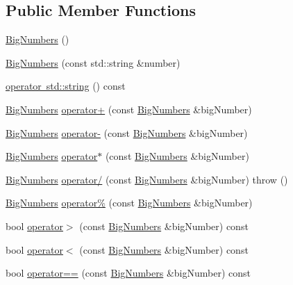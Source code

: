 \subsection*{Public Member Functions}
\begin{DoxyCompactItemize}
\item 
\mbox{\hyperlink{class_big_numbers_af3dd82883f10f3473ac83280f26b0ad8}{Big\+Numbers}} ()
\item 
\mbox{\hyperlink{class_big_numbers_a7aca99911efb6981ac70f1514e8f2a5e}{Big\+Numbers}} (const std\+::string \&number)
\item 
\mbox{\hyperlink{class_big_numbers_af879df797b67fcbe442746d0532529ab}{operator std\+::string}} () const
\item 
\mbox{\hyperlink{class_big_numbers}{Big\+Numbers}} \mbox{\hyperlink{class_big_numbers_a680111de22672f72e0e102b42352d3bc}{operator+}} (const \mbox{\hyperlink{class_big_numbers}{Big\+Numbers}} \&big\+Number)
\item 
\mbox{\hyperlink{class_big_numbers}{Big\+Numbers}} \mbox{\hyperlink{class_big_numbers_ad4b60c48e9da0bd5f9845d7ce73bdc90}{operator-\/}} (const \mbox{\hyperlink{class_big_numbers}{Big\+Numbers}} \&big\+Number)
\item 
\mbox{\hyperlink{class_big_numbers}{Big\+Numbers}} \mbox{\hyperlink{class_big_numbers_a831e8203da581ad999f9f45940a92776}{operator$\ast$}} (const \mbox{\hyperlink{class_big_numbers}{Big\+Numbers}} \&big\+Number)
\item 
\mbox{\hyperlink{class_big_numbers}{Big\+Numbers}} \mbox{\hyperlink{class_big_numbers_af7ad124c6e92a0ae647f3aa3cd85f11a}{operator/}} (const \mbox{\hyperlink{class_big_numbers}{Big\+Numbers}} \&big\+Number)  throw ()
\item 
\mbox{\hyperlink{class_big_numbers}{Big\+Numbers}} \mbox{\hyperlink{class_big_numbers_a15bc2fa1946a85e8cd745a26e460d51e}{operator\%}} (const \mbox{\hyperlink{class_big_numbers}{Big\+Numbers}} \&big\+Number)
\item 
bool \mbox{\hyperlink{class_big_numbers_a5fed3d1c9f239f4c57348953077eab77}{operator$>$}} (const \mbox{\hyperlink{class_big_numbers}{Big\+Numbers}} \&big\+Number) const
\item 
bool \mbox{\hyperlink{class_big_numbers_aed0d88ccd1ba6d7b1548c14a95de1b1a}{operator$<$}} (const \mbox{\hyperlink{class_big_numbers}{Big\+Numbers}} \&big\+Number) const
\item 
bool \mbox{\hyperlink{class_big_numbers_a7c84969ba0fe1401cfb30544cb0d91a5}{operator==}} (const \mbox{\hyperlink{class_big_numbers}{Big\+Numbers}} \&big\+Number) const
\end{DoxyCompactItemize}
